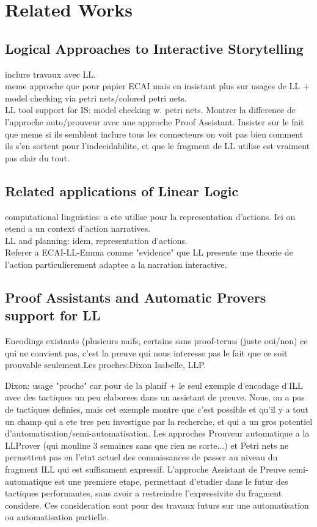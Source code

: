 \documentclass[runningheads,a4paper]{llncs}
\begin{document}
\section{Related Works}
\subsection{Logical Approaches to Interactive Storytelling}
inclure travaux avec LL.\\
meme approche que pour papier ECAI mais en insistant plus sur usages de LL + model checking via petri nets/colored petri nets.\\
LL tool support for IS: model checking w. petri nets. Montrer la difference de l'approche auto/prouveur avec une approche Proof Assistant. Insister sur le fait que meme si ils semblent inclure tous les connecteurs on voit pas bien comment ils s'en sortent pour l'indecidabilite, et que le fragment de LL utilise est vraiment pas clair du tout.
\subsection{Related applications of Linear Logic}
computational linguistics: a ete utilise pour la representation d'actions. Ici on etend a un context d'action narratives.\\
LL and planning: idem, representation d'actions.\\
Referer a ECAI-LL-Emma comme "evidence" que LL presente une theorie de l'action particulierement adaptee a la narration interactive.
\subsection{Proof Assistants and Automatic Provers support for LL}
Encodings existants (plusieurs naifs, certains sans proof-terms (juste oui/non) ce qui ne convient pas, c'est la preuve qui nous interesse pas le fait que ce soit prouvable seulement.Les proches:Dixon Isabelle, LLP. 

Dixon: usage "proche" car pour de la planif + le seul exemple d'encodage d'ILL avec des tactiques un peu elaborees dans un assistant de preuve. Nous, on a pas de tactiques definies, mais cet exemple montre que c'est possible et qu'il y a tout un champ qui a ete tres peu investigue par la recherche, et qui a un gros potentiel d'automatisation/semi-automatisation. Les approches Prouveur automatique  a la LLProver (qui mouline 3 semaines sans que rien ne sorte...) et Petri nets ne permettent pas en l'etat actuel des connaissances de passer au niveau du fragment ILL qui est suffisament expressif. L'approche Assistant de Preuve semi-automatique est une premiere etape, permettant d'etudier dans le futur des tactiques performantes, sans avoir a restreindre l'expressivite du fragment considere. Ces consideration sont pour des travaux futurs sur une automatisation ou automatisation partielle.
\end{document}
